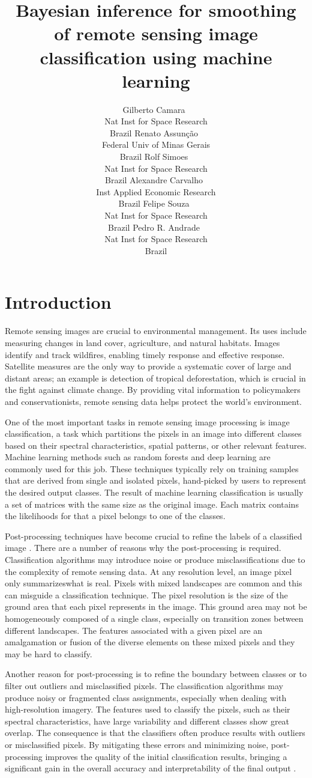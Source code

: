 \documentclass[
  shortnames]{jss}
\author{
Gilberto Camara~\orcidlink{0000-0002-3681-487X}\\Nat Inst for Space Research\\
Brazil \And Renato Assunção~\orcidlink{0000-0001-7442-9166}\\Federal Univ of Minas Gerais\\
Brazil \And Rolf Simoes~\orcidlink{0000-0003-0953-4132}\\Nat Inst for Space Research\\
Brazil \AND Alexandre Carvalho~\orcidlink{0000-0001-8762-5465}\\Inst Applied Economic Research\\
Brazil \And Felipe Souza~\orcidlink{0000-XXXXX}\\Nat Inst for Space Research\\
Brazil \And Pedro R. Andrade~\orcidlink{0000-0001-8675-4046}\\Nat Inst for Space Research\\
Brazil
}
\title{Bayesian inference for smoothing of remote sensing image classification using machine learning}
\begin{document}
\newpage

\hypertarget{introduction}{%
\section{Introduction}\label{introduction}}

Remote sensing images are crucial to environmental management. Its uses include measuring changes in land cover, agriculture, and natural habitats. Images identify and track wildfires, enabling timely response and effective response. Satellite measures are the only way to provide a systematic cover of large and distant areas; an example is detection of tropical deforestation, which is crucial in the fight against climate change. By providing vital information to policymakers and conservationists, remote sensing data helps protect the world's environment.

One of the most important tasks in remote sensing image processing is image classification, a task which partitions the pixels in an image into different classes based on their spectral characteristics, spatial patterns, or other relevant features. Machine learning methods such as random forests \citep{Belgiu2016} and deep learning \citep{Ma2019} are commonly used for this job. These techniques typically rely on training samples that are derived from single and isolated pixels, hand-picked by users to represent the desired output classes. The result of machine learning classification is usually a set of matrices with the same size as the original image. Each matrix contains the likelihoods for that a pixel belongs to one of the classes.

Post-processing techniques have become crucial to refine the labels of a classified image \citep{Huang2014}. There are a number of reasons why the post-processing is required. Classification algorithms may introduce noise or produce misclassifications due to the complexity of remote sensing data. At any resolution level, an image pixel only summarizeswhat is real. Pixels with mixed landscapes are common and this can misguide a classification technique. The pixel resolution is the size of the ground area that each pixel represents in the image. This ground area may not be homogeneously composed of a single class, especially on transition zones between different landscapes. The features associated with a given pixel are an amalgamation or fusion of the diverse elements on these mixed pixels and they may be hard to classify.

Another reason for post-processing is to refine the boundary between classes or to filter out outliers and misclassified pixels. The classification algorithms may produce noisy or fragmented class assignments, especially when dealing with high-resolution imagery. The features used to classify the pixels, such as their spectral characteristics, have large variability and different classes show great overlap. The consequence is that the classifiers often produce results with outliers or misclassified pixels. By mitigating these errors and minimizing noise, post-processing improves the quality of the initial classification results, bringing a significant gain in the overall accuracy and interpretability of the final output \citep{Schindler2012}.
\end{document}
